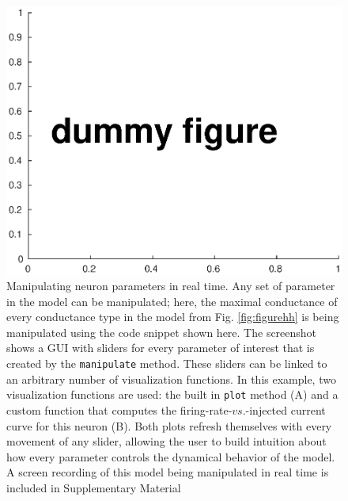 \documentclass{frontiersSCNS} %
\begin{document}
\begin{figure}
	\centering
	\includegraphics[width=1.0\linewidth]{gfx/figure_manipulate}
	\caption{Manipulating neuron parameters in real time. Any set of parameter in the model can be manipulated; here, the maximal conductance of every conductance type in the model from Fig. \ref{fig:figurehh} is being manipulated using the code snippet shown here. The screenshot shows a GUI with sliders for every parameter of interest that is created by the \texttt{manipulate} method. These sliders can be linked to an arbitrary number of visualization functions. In this example, two visualization functions are used: the built in \texttt{plot} method (A) and a custom function that computes the firing-rate-$vs$.-injected current curve for this neuron (B). Both plots refresh themselves with every movement of any slider, allowing the user to build intuition about how every parameter controls the dynamical behavior of the model. A screen recording of this model being manipulated in real time is included in Supplementary Material}
	\label{fig:figuremanipulate}
\end{figure}

\clearpage
\end{document}
